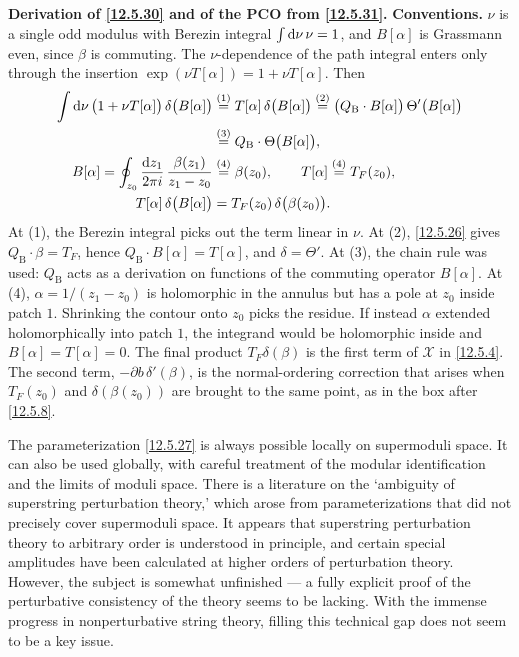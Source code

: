 \begin{tcolorbox}[breakable]
	\begin{remark}
		\textbf{Derivation of \eqref{12.5.30} and of the PCO from \eqref{12.5.31}.} \textbf{Conventions.} $\nu$ is a single odd modulus with Berezin integral $\int\mathrm{d}\nu\,\nu=1$, and $B[\alpha]$ is Grassmann even, since $\beta$ is commuting. The $\nu$-dependence of the path integral enters only through the insertion $\exp(\nu T[\alpha])=1+\nu T[\alpha]$. Then
		\begin{align*}
			\int\mathrm{d}\nu\,\bigl(1+\nu T[\alpha]\bigr)\,\delta\bigl(B[\alpha]\bigr)
			&\overset{(1)}{=} T[\alpha]\,\delta\bigl(B[\alpha]\bigr)
			\overset{(2)}{=} \bigl(Q_{\mathrm B}\cdot B[\alpha]\bigr)\,\Theta'\bigl(B[\alpha]\bigr)\\
			&\overset{(3)}{=} Q_{\mathrm B}\cdot\Theta\bigl(B[\alpha]\bigr) ,\\
			B[\alpha]=\oint_{z_{0}}\frac{\mathrm{d} z_{1}}{2\pi i}\,\frac{\beta(z_{1})}{z_{1}-z_{0}}
			&\overset{(4)}{=} \beta(z_{0}) ,\qquad T[\alpha]\overset{(4)}{=} T_{F}(z_{0}) ,\\
			T[\alpha]\,\delta\bigl(B[\alpha]\bigr)&=T_{F}(z_{0})\,\delta\bigl(\beta(z_{0})\bigr) .
		\end{align*}
		At (1), the Berezin integral picks out the term linear in $\nu$. At (2), \eqref{12.5.26} gives $Q_{\mathrm B}\cdot\beta=T_{F}$, hence $Q_{\mathrm B}\cdot B[\alpha]=T[\alpha]$, and $\delta=\Theta'$. At (3), the chain rule was used: $Q_{\mathrm B}$ acts as a derivation on functions of the commuting operator $B[\alpha]$. At (4), $\alpha=1/(z_{1}-z_{0})$ is holomorphic in the annulus but has a pole at $z_{0}$ inside patch $1$. Shrinking the contour onto $z_{0}$ picks the residue. If instead $\alpha$ extended holomorphically into patch $1$, the integrand would be holomorphic inside and $B[\alpha]=T[\alpha]=0$. The final product $T_{F}\delta(\beta)$ is the first term of $\mathcal X$ in \eqref{12.5.4}. The second term, $-\partial b\,\delta'(\beta)$, is the normal-ordering correction that arises when $T_{F}(z_{0})$ and $\delta(\beta(z_{0}))$ are brought to the same point, as in the box after \eqref{12.5.8}.
	\end{remark}
\end{tcolorbox}

The parameterization \eqref{12.5.27} is always possible locally on supermoduli space. It can also be used globally, with careful treatment of the modular identification and the limits of moduli space. There is a literature on the `ambiguity of superstring perturbation theory,' which arose from parameterizations that did not precisely cover supermoduli space. It appears that superstring perturbation theory to arbitrary order is understood in principle, and certain special amplitudes have been calculated at higher orders of perturbation theory. However, the subject is somewhat unfinished --- a fully explicit proof of the perturbative consistency of the theory seems to be lacking. With the immense progress in nonperturbative string theory, filling this technical gap does not seem to be a key issue.

